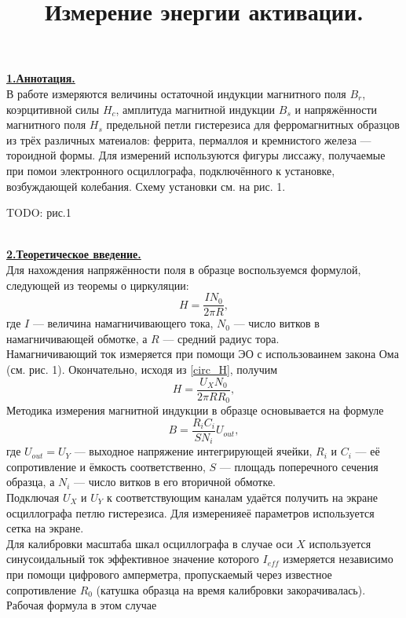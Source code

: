 \documentclass[12pt, letterpaper, oneside]{article}
\title{Измерение энергии активации.}
\begin{document}
\maketitle
\noindent\textbf{\underline{1.Аннотация.}}\\
В работе измеряются величины остаточной индукции магнитного поля $B_r$, коэрцитивной силы $H_c$, амплитуда магнитной индукции $B_s$ и напряжённости магнитного поля $H_s$ предельной петли гистерезиса для ферромагнитных образцов из трёх различных матеиалов: феррита, пермаллоя и кремнистого железа — тороидной формы. Для измерений используются фигуры лиссажу, получаемые при помои электронного осциллографа, подключённого к установке, возбуждающей колебания. Схему установки см. на рис. 1.\\
\begin{Huge}
TODO: рис.1
\end{Huge}\\
\textbf{\underline{2.Теоретическое введение.}}\\
Для нахождения напряжённости поля в образце воспользуемся формулой, следующей из теоремы о циркуляции:
\begin{equation}\label{circ_H}
H = \frac{I N_0}{2\pi R},
\end{equation}
где $I$ — величина намагничивающего тока, $N_0$ — число витков в намагничивающей обмотке, а $R$ — средний радиус тора.\\
Намагничивающий ток измеряется при помощи ЭО с использоваинем закона Ома (см. рис. 1). Окончательно, исходя из \ref{circ_H}, получим
\begin{equation}\label{X_formula}
H = \frac{U_X N_0}{2\pi R R_0},
\end{equation}
Методика измерения магнитной индукции в образце основывается на формуле
\begin{equation}\label{Y_formula}
B = \frac{R_i C_i}{S N_i}U_{out},
\end{equation}
где $U_{out} = U_Y$ — выходное напряжение интегрирующей ячейки, $R_i$ и $C_i$ — её сопротивление и ёмкость соответственно, $S$ — площадь поперечного сечения образца, а $N_i$ — число витков в его вторичной обмотке.\\
Подключая $U_X$ и $U_Y$ к соответствующим каналам удаётся получить на экране осциллографа петлю гистерезиса. Для измеренияеё параметров используется сетка на экране.\\
Для калибровки масштаба шкал осциллографа в случае оси $X$ используется синусоидальный ток эффективное значение которого $I_{eff}$ измеряется независимо при помощи цифрового амперметра, пропускаемый через известное сопротивление $R_0$ (катушка образца на время калибровки закорачивалась). Рабочая формула в этом случае
\end{document}
